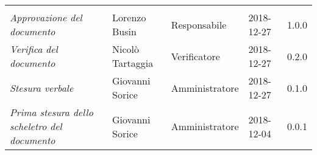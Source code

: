 \newpage 
\section*{}
\begin{table}[H]
	\centering
	\begin{tabular}{p{4cm}|C{3cm}|C{3cm}|R{2.5cm}|R{2cm}}
		
		 & & & & \\
		
		
		\emph{Approvazione del documento} &  Lorenzo Busin & Responsabile & 2018-12-27 & 1.0.0 \\
		\hline
		
		\emph{Verifica del documento} & Nicolò Tartaggia & Verificatore & 2018-12-27 & 0.2.0 \\
		\hline

		\emph{Stesura verbale} & Giovanni Sorice & Amministratore & 2018-12-27 & 0.1.0 \\
		\hline
		
		\emph{Prima stesura dello scheletro del documento} & Giovanni Sorice & Amministratore & 2018-12-04 & 0.0.1 \\
		
	\end{tabular}
	
\end{table}


\clearpage